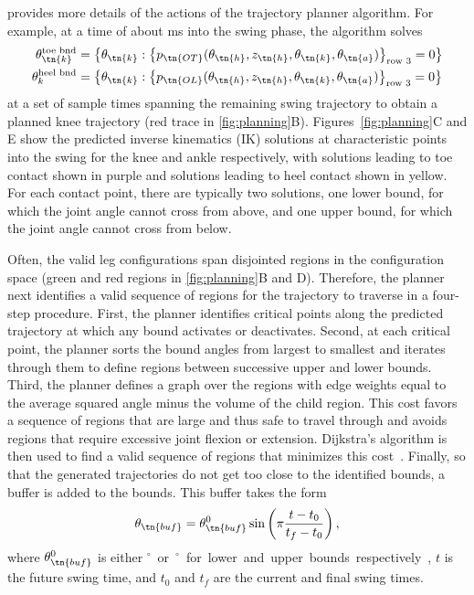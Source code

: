  provides more details of the actions of the trajectory
planner algorithm. For example, at a time of about \unit[150]{ms} into the swing
phase, the algorithm solves
\begin{align}
    \theta_\tn{k}^\textrm{toe bnd} 
        &= \left\{\theta_\tn{k} : \left\{p_\tn{OT}
            (\theta_\tn{h}, z_\tn{h}, \theta_\tn{k}, \theta_\tn{a})
            \right\}_\textrm{row 3} = 0 \right\} \\
    \theta_k^\textrm{heel bnd} 
        &= \left\{\theta_\tn{k} : \left\{p_\tn{OL}
            (\theta_\tn{h}, z_\tn{h}, \theta_\tn{k}, \theta_\tn{a})
            \right\}_\textrm{row 3} = 0 \right\}
\end{align}
at a set of sample times spanning the remaining swing trajectory to obtain a
planned knee trajectory (red trace in \cref{fig:planning}B).
Figures~\cref{fig:planning}C and E show the predicted inverse kinematics (IK)
solutions at characteristic points into the swing for the knee and ankle
respectively, with solutions leading to toe contact shown in purple and
solutions leading to heel contact shown in yellow. For each contact point, there
are typically two solutions, one lower bound, for which the joint angle cannot
cross from above, and one upper bound, for which the joint angle cannot cross
from below. 

Often, the valid leg configurations span disjointed regions in the configuration
space (green and red regions in \cref{fig:planning}B and D). Therefore, the
planner next identifies a valid sequence of regions for the trajectory to
traverse in a four-step procedure.  First, the planner identifies critical
points along the predicted trajectory at which any bound activates or
deactivates. Second, at each critical point, the planner sorts the bound angles
from largest to smallest and iterates through them to define regions between
successive upper and lower bounds. Third, the planner defines a graph over the
regions with edge weights equal to the average squared angle minus the volume of
the child region. This cost favors a sequence of regions that are large and thus
safe to travel through and avoids regions that require excessive joint flexion
or extension. Dijkstra's algorithm is then used to find a valid sequence of
regions that minimizes this cost~\citep{dijkstra1959note}. Finally, so that the
generated trajectories do not get too close to the identified bounds, a buffer
is added to the bounds. This buffer takes the form
\begin{align}
    \theta_\tn{buf} = \theta_\tn{buf}^0 \sin 
        \left(\pi \frac{t - t_0}{t_f - t_0} \right),
\end{align}
where $\theta_\tn{buf}^0$ is either \unit[5]{$^\circ$} or \unit[-5]{$^\circ$}
for lower and upper bounds respectively, $t$ is the future swing time, and $t_0$
and $t_f$ are the current and final swing times.

